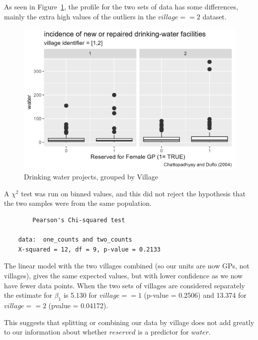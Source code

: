 \documentclass[12pt,letterpaper]{article}
\begin{document}
  As seen in Figure~\ref{fig:village_boxplot}, the profile for the two sets of data 
  has some differences, mainly the extra high values of the outliers in the 
  $village == 2$ dataset.
  
  \begin{figure}[htb!]
	\caption{\footnotesize{Drinking water projects, grouped by Village}}
	\vspace{.5cm}
	\centering
	\label{fig:village_boxplot}
	\includegraphics[width=1.0\textwidth]{graphics/village_water_boxplot.png}
  \end{figure}		
	
  A $\chi^2$ test was run on binned values, and this did not reject the hypothesis
  that the two samples were from the same population.
  
  \begin{verbatim}
    	Pearson's Chi-squared test

    data:  one_counts and two_counts
    X-squared = 12, df = 9, p-value = 0.2133
  \end{verbatim}
  
  The linear model with the two villages combined (so our units are now GPs, not 
  villages), gives the same expected values, but with lower confidence as we now 
  have fewer data points.  When the two sets of villages are considered separately
  the estimate for $\beta_1$ is 5.130 for $village==1$ (p-value = 0.2506) and 
  13.374 for $village==2$ (pvalue = 0.04172).
  
  This suggests that splitting or combining our data by village does not add greatly
  to our information about whether $reserved$ is a predictor for $water$. 

  
  
  
\newpage
{}
	  
\end{document}
